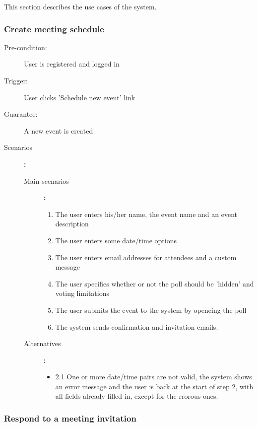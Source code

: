 This section describes the use cases of the system.

\subsubsection{Create meeting schedule}

\begin{description}
	\item[Pre-condition:] User is registered and logged in
	\item[Trigger:] User clicks 'Schedule new event' link
	\item[Guarantee:] A new event is created
	\item[Scenarios]\textbf{:}\\
				\begin{description}
					\item[Main scenarios]\textbf{:}\\
								\begin{enumerate}
									\item The user enters his/her name, the event name and an event description
									\item The user enters some date/time options
									\item The user enters email addresses for attendees and a custom message
									\item The user specifies whether or not the poll should be 'hidden' and voting limitations
									\item The user submits the event to the system by openeing the poll
									\item The system sends confirmation and invitation emails.
								\end{enumerate}
					\item[Alternatives]\textbf{:}\\
								\begin{itemize}
									\item 2.1 One or more date/time pairs are not valid, the system shows an error message and the user is back at the start of step 2, with all fields already filled in, except for the rrorous ones.
								\end{itemize}
				\end{description}
\end{description}


\subsubsection{Respond to a meeting invitation}

